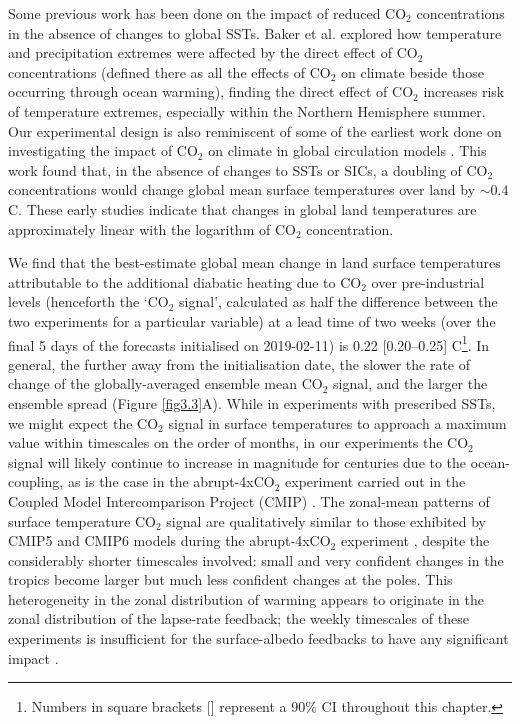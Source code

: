   Some previous work has been done on the impact of reduced CO$_2$ concentrations in the absence of changes to global SSTs. Baker et al. \citep{baker_higher_2018} explored how temperature and precipitation extremes were affected by the direct effect of CO$_2$ concentrations (defined there as all the effects of CO$_2$ on climate beside those occurring through ocean warming), finding the direct effect of CO$_2$ increases risk of temperature extremes, especially within the Northern Hemisphere summer. Our experimental design is also reminiscent of some of the earliest work done on investigating the impact of CO$_2$ on climate in global circulation models \citep{gates_preliminary_1981,mitchell_seasonal_1983}. This work found that, in the absence of changes to SSTs or SICs, a doubling of CO$_2$ concentrations would change global mean surface temperatures over land by $\sim0.4$ \textdegree{}C. These early studies indicate that changes in global land temperatures are approximately linear with the logarithm of CO$_2$ concentration.
  
  We find that the best-estimate global mean change in land surface temperatures attributable to the additional diabatic heating due to CO$_2$ over pre-industrial levels (henceforth the `CO$_2$ signal', calculated as half the difference between the two experiments for a particular variable) at a lead time of two weeks (over the final 5 days of the forecasts initialised on 2019-02-11) is 0.22 [0.20--0.25] \degree C\footnote{Numbers in square brackets [] represent a 90\% CI throughout this chapter.}. In general, the further away from the initialisation date, the slower the rate of change of the globally-averaged ensemble mean CO$_2$ signal, and the larger the ensemble spread (Figure \ref{fig3.3}A). While in experiments with prescribed SSTs, we might expect the CO$_2$ signal in surface temperatures to approach a maximum value within timescales on the order of months, in our experiments the CO$_2$ signal will likely continue to increase in magnitude for centuries due to the ocean-coupling, as is the case in the abrupt-4xCO$_2$ experiment carried out in the Coupled Model Intercomparison Project (CMIP) \citep{taylor_overview_2012,eyring_overview_2016,rugenstein_equilibrium_2020}. The zonal-mean patterns of surface temperature CO$_2$ signal are qualitatively similar to those exhibited by CMIP5 and CMIP6 models during the abrupt-4xCO$_2$ experiment \citep{flynn_climate_2020,andrews_dependence_2015}, despite the considerably shorter timescales involved: small and very confident changes in the tropics become larger but much less confident changes at the poles. This heterogeneity in the zonal distribution of warming appears to originate in the zonal distribution of the lapse-rate feedback; the weekly timescales of these experiments is insufficient for the surface-albedo feedbacks to have any significant impact \citep{smith_polar_2019}.
  
